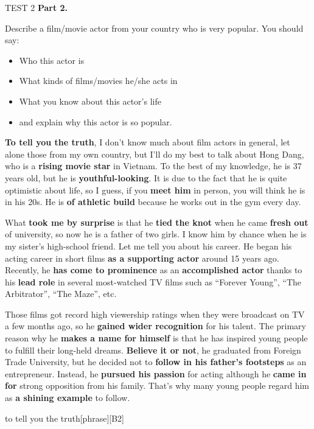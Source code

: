 \begin{glossarymc}[Cambridge 12]
\begin{test}{TEST 2}
    \noindent
    \textbf{Part 2.}
    \begin{qa}{Describe a film/movie actor from your country who is very popular. You should say:}
    \begin{itemize}
        \item Who this actor is
        \item What kinds of films/movies he/she acts in
        \item What you know about this actor’s life
        \item and explain why this actor is so popular.
    \end{itemize}

    \textbf{To tell you the truth}, I don’t know much about film actors in general, let alone those from my own country, but I’ll do my best to talk about Hong Dang, who is a \textbf{rising movie star} in Vietnam. To the best of my knowledge, he is 37 years old, but he is \textbf{youthful-looking}. It is due to the fact that he is quite optimistic about life, so I guess, if you \textbf{meet him} in person, you will think he is in his 20s. He is \textbf{of athletic build} because he works out in the gym every day.  

    What \textbf{took me by surprise} is that he \textbf{tied the knot} when he came \textbf{fresh out} of university, so now he is a father of two girls. I know him by chance when he is my sister’s high-school friend. Let me tell you about his career. He began his acting career in short films \textbf{as a supporting actor} around 15 years ago. Recently, he \textbf{has come to prominence} as an \textbf{accomplished actor} thanks to his \textbf{lead role} in several most-watched TV films such as “Forever Young”, “The Arbitrator”, “The Maze”, etc.  

    Those films got record high viewership ratings when they were broadcast on TV a few months ago, so he \textbf{gained wider recognition} for his talent. The primary reason why he \textbf{makes a name for himself} is that he has inspired young people to fulfill their long-held dreams. \textbf{Believe it or not}, he graduated from Foreign Trade University, but he decided not to \textbf{follow in his father’s footsteps} as an entrepreneur. Instead, he \textbf{pursued his passion} for acting although he \textbf{came in for} strong opposition from his family. That’s why many young people regard him as \textbf{a shining example} to follow.
    \end{qa}

        \begin{VocabExplain}[Part 2]
            \begin{ExplainCard}{to tell you the truth}[phrase][B2]
            \end{ExplainCard}


\end{VocabExplain}
\end{test}
\end{glossarymc}
